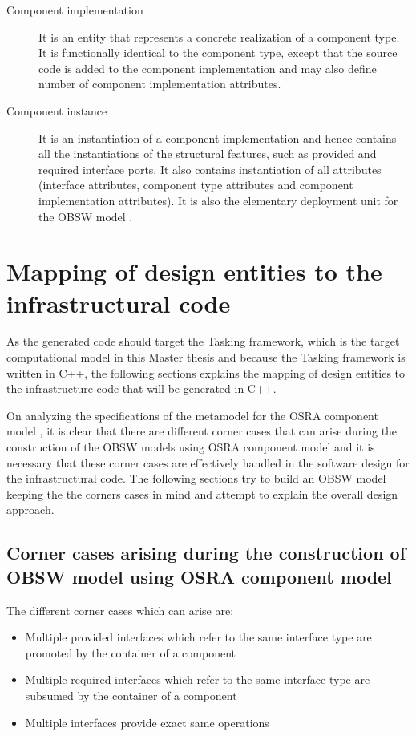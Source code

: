 \begin{description}
\item [Component implementation] It is an entity that represents a concrete realization of a component type. It is functionally identical to the component type, except that the source code is added to the component implementation and may also define number of component implementation attributes.

\item [Component instance] It is an instantiation of a component implementation and hence contains all the instantiations of the structural features, such as provided and required interface ports. It also contains instantiation of all attributes (interface attributes, component type attributes and component implementation attributes). It is also the elementary deployment unit for the OBSW model \cite{SpecMetamodel}.        
\end{description}

\section{Mapping of design entities to the infrastructural code}
As the generated code should target the Tasking framework, which is the target computational model in this Master thesis and because the Tasking framework is written in C++, the following sections explains the mapping of design entities to the infrastructure code that will be generated in C++.

On analyzing the specifications of the metamodel for the OSRA component model \cite{SpecMetamodel}, it is clear that there are different corner cases that can arise during the construction of the OBSW models using OSRA component model and it is necessary that these corner cases are effectively handled in the software design for the infrastructural code. The following sections try to build an OBSW model keeping the the corners cases in mind and attempt to explain the overall design approach.

\subsection{Corner cases arising during the construction of OBSW model using OSRA component model}
\label{section: Corner cases}
The different corner cases which can arise are:

\begin{itemize}
\item Multiple provided interfaces which refer to the same interface type are promoted by the container of a component
\item Multiple required interfaces which refer to the same interface type are subsumed by the container of a component
\item Multiple interfaces provide exact same operations
\end{itemize}

